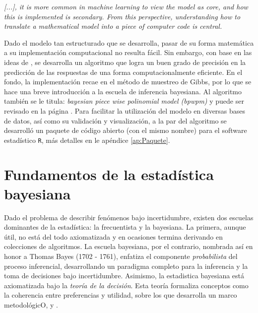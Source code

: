 \documentclass[../Main/Main.tex]{subfiles}
\begin{document}
\epigraph{\textit{[...], it is more common in machine learning to view the model as core, and how this is implemented
is secondary. From this perspective, understanding how to translate a mathematical model into a piece of
computer code is central.}}{\citet{barber2010bayesian}}

Dado el modelo tan estructurado que se desarrolla, pasar de su forma matemática a su implementación computacional no resulta fácil. Sin embargo, con base en las ideas de \citet{albert1993bayesian}, se desarrolla un algoritmo que logra un buen grado de precisión en la predicción de las respuestas de una forma computacionalmente eficiente. En el fondo, la implementación recae en el método de muestreo de Gibbs, por lo que se hace una breve introducción a la escuela de inferencia bayesiana. Al algoritmo también se le titula: \textit{bayesian piece wise polinomial model (bpwpm)} y puede ser revisado en la página \pageref{alg:bpwpm}. Para facilitar la utilización del modelo en diversas bases de datos, así como su validación y visualización, a la par del algoritmo se desarrolló un paquete de código abierto (con el mismo nombre) para el software estadístico \verb|R|, más detalles en le apéndice \ref{ap:Paquete}.

\section{Fundamentos de la estadística bayesiana}
Dado el problema de describir fenómenos bajo incertidumbre, existen dos escuelas dominantes de la estadística: la frecuentista y la bayesiana. La primera, aunque útil, no está del todo axiomatizada y en ocasiones termina derivando en colecciones de algoritmos. La escuela bayesiana, por el contrario, nombrada así en honor a Thomas Bayes (1702 - 1761), enfatiza el componente \textit{probabilista} del proceso inferencial, desarrollando un paradigma completo para la inferencia y la toma de decisiones bajo incertidumbre. Asimismo, la estadistica bayesiana está axiomatizada bajo la \textit{teoría de la decisión}. Esta teoría formaliza conceptos como la coherencia entre preferencias y utilidad, sobre los que desarrolla un marco metodológicO, \autocite{bernardo2001bayesian} y \autocite{mendoza2011estadistica}.
\end{document}
